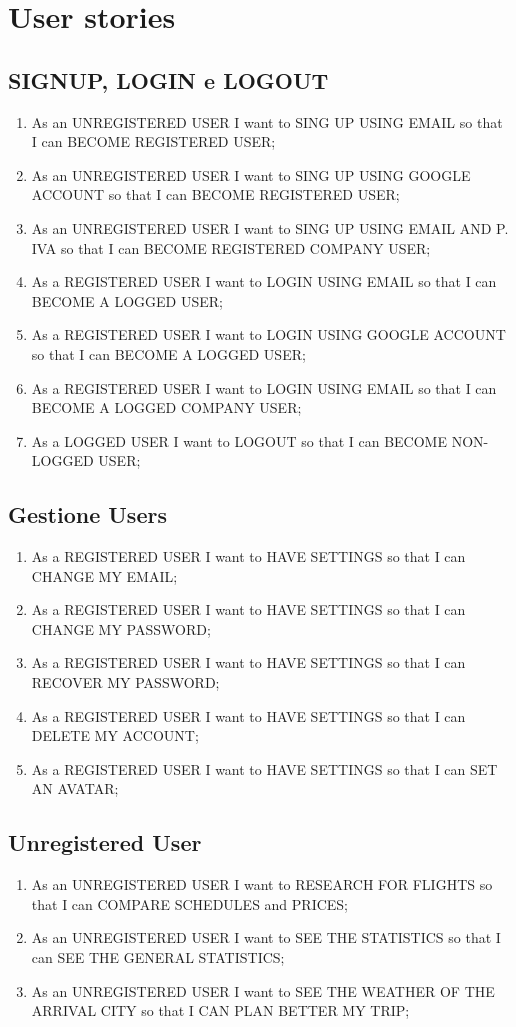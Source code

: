 \documentclass[11pt]{article}
\begin{document}
\section{User stories}

\subsection{SIGNUP, LOGIN e LOGOUT}
\begin{enumerate}
	\item As an UNREGISTERED USER I want to SING UP USING EMAIL so that I can BECOME REGISTERED USER;
	\item As an UNREGISTERED USER I want to SING UP USING GOOGLE ACCOUNT so that I can BECOME REGISTERED USER;
	\item As an UNREGISTERED USER I want to SING UP USING EMAIL AND P. IVA so that I can BECOME REGISTERED COMPANY USER;
	\item As a REGISTERED USER I want to LOGIN USING EMAIL so that I can BECOME A LOGGED USER;
	\item As a REGISTERED USER I want to LOGIN USING GOOGLE ACCOUNT so that I can BECOME A LOGGED USER;
	\item As a REGISTERED USER I want to LOGIN USING EMAIL so that I can BECOME A LOGGED COMPANY USER;
	\item As a LOGGED USER I want to LOGOUT so that I can BECOME NON-LOGGED USER;
\end{enumerate}

\subsection{Gestione Users}
\begin{enumerate}
	\item As a REGISTERED USER I want to HAVE SETTINGS so that I can CHANGE MY EMAIL;
	\item As a REGISTERED USER I want to HAVE SETTINGS so that I can CHANGE MY PASSWORD;
	\item As a REGISTERED USER I want to HAVE SETTINGS so that I can RECOVER MY PASSWORD;
	\item As a REGISTERED USER I want to HAVE SETTINGS so that I can DELETE MY ACCOUNT;
	\item As a REGISTERED USER I want to HAVE SETTINGS so that I can SET AN AVATAR;
\end{enumerate}

\subsection{Unregistered User}
\begin{enumerate}
	\item As an UNREGISTERED USER I want to RESEARCH FOR FLIGHTS so that I can COMPARE SCHEDULES and PRICES;
	\item As an UNREGISTERED USER I want to SEE THE STATISTICS so that I can SEE THE GENERAL STATISTICS;
	\item As an UNREGISTERED USER I want to SEE THE WEATHER OF THE ARRIVAL CITY so that I CAN PLAN BETTER MY TRIP;
\end{enumerate}
\end{document}
